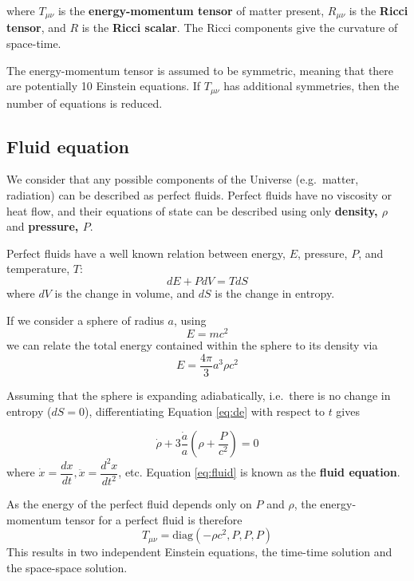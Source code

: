 \documentclass[11pt,a4paper,notoc]{tufte-handout}
\begin{document}
where \({T_{\mu\nu}}\) is the \textbf{energy-momentum tensor} of matter
present, \({R_{\mu\nu}}\) is the \textbf{Ricci tensor}, and \({R}\)
is the \textbf{Ricci scalar}. The Ricci components give the curvature of
space-time.

The energy-momentum tensor is assumed to be symmetric, meaning that
there are potentially 10 Einstein equations. If \(T_{\mu\nu}\) has
additional symmetries, then the number of equations is reduced.

\hypertarget{sec:fluid-eqns}{%
\subsection{Fluid equation}\label{sec:fluid-eqns}}

We consider that any possible components of the Universe (e.g.~matter,
radiation) can be described as perfect fluids. Perfect fluids have no
viscosity or heat flow, and their equations of state can be described
using only \textbf{density, \(\rho\)} and \textbf{pressure, \(P\)}.

Perfect fluids have a well known relation between energy, \(E\), pressure,
\(P\), and temperature, \(T\):
\begin{equation}
dE + PdV = TdS
\label{eq:de}
\end{equation}
where \(dV\) is the change in volume, and \(dS\) is the
change in entropy.

If we consider a sphere of radius \(a\), using
\begin{equation}
E = mc^2
\label{eq:emc2}
\end{equation}
we can relate
the total energy contained within the sphere to its density via
\begin{equation}
E = \dfrac{4\pi}{3}a^3\rho c^2
\label{eq:e-rho}
\end{equation}

Assuming that the sphere is expanding adiabatically, i.e.~there is no
change in entropy (\(dS = 0\)), differentiating
Equation \eqref{eq:de}
with respect to \(t\) gives

\begin{equation}
    \dot{\rho} + 3\dfrac{\dot{a}}{a}\left(\rho + \dfrac{P}{c^2}\right) = 0
\label{eq:fluid}
\end{equation}
where \(\dot{x} = \dfrac{dx}{dt}, \ddot{x} = \dfrac{d^2x}{dt^2}\), etc. Equation \eqref{eq:fluid} is known as the \textbf{fluid equation}.

As the energy of the perfect fluid depends only on \(P\) and \(\rho\), the
energy-momentum tensor for a perfect fluid is therefore
\begin{equation}
T_{\mu\nu} = \text{diag}\left(-\rho c^2, P, P, P\right)
\label{eq:per-fluid}
\end{equation}
This results
in two independent Einstein equations, the time-time solution and the
space-space solution.
\end{document}
